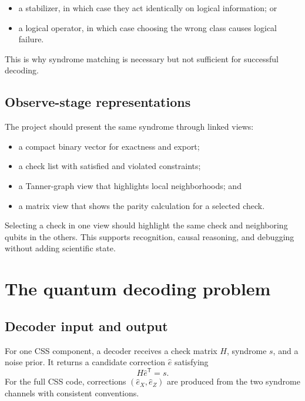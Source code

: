 \documentclass[11pt,letterpaper]{article}
\begin{document}
\begin{itemize}
  \item a stabilizer, in which case they act identically on logical information; or
  \item a logical operator, in which case choosing the wrong class causes logical failure.
\end{itemize}

This is why syndrome matching is necessary but not sufficient for successful decoding.

\subsection{Observe-stage representations}

The project should present the same syndrome through linked views:

\begin{itemize}
  \item a compact binary vector for exactness and export;
  \item a check list with satisfied and violated constraints;
  \item a Tanner-graph view that highlights local neighborhoods; and
  \item a matrix view that shows the parity calculation for a selected check.
\end{itemize}

Selecting a check in one view should highlight the same check and neighboring qubits in the others.
This supports recognition, causal reasoning, and debugging without adding scientific state.

\section{The quantum decoding problem}

\subsection{Decoder input and output}

For one CSS component, a decoder receives a check matrix $H$, syndrome $s$, and a noise prior. It
returns a candidate correction $\hat e$ satisfying
\begin{equation}
  H\hat e^{\mathsf T}=s.
  \label{eq:syndrome-consistency}
\end{equation}
For the full CSS code, corrections $(\hat e_X,\hat e_Z)$ are produced from the two syndrome
channels with consistent conventions.
\end{document}
